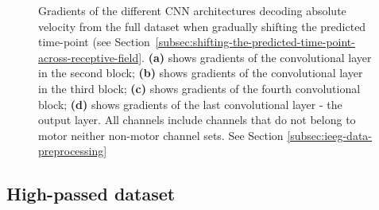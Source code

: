 \begin{figure}[!htpb]
\caption[]{Gradients of the different CNN architectures decoding absolute velocity from the full dataset when gradually shifting the predicted time-point (see Section~\ref{subsec:shifting-the-predicted-time-point-across-receptive-field}. \textbf{(a)} shows gradients of the convolutional layer in the second block; \textbf{(b)} shows gradients of the convolutional layer in the third block; \textbf{(c)} shows gradients of the fourth convolutional block; \textbf{(d)} shows gradients of the last convolutional layer - the output layer. All channels include channels that do not belong to motor neither non-motor channel sets. See Section \ref{subsec:ieeg-data-preprocessing}}
\label{fig:absVel-shifting-grads}
\end{figure}

\clearpage
\subsection*{High-passed dataset}\label{subsec:absVel-high-passed-dataset-appendixC}
